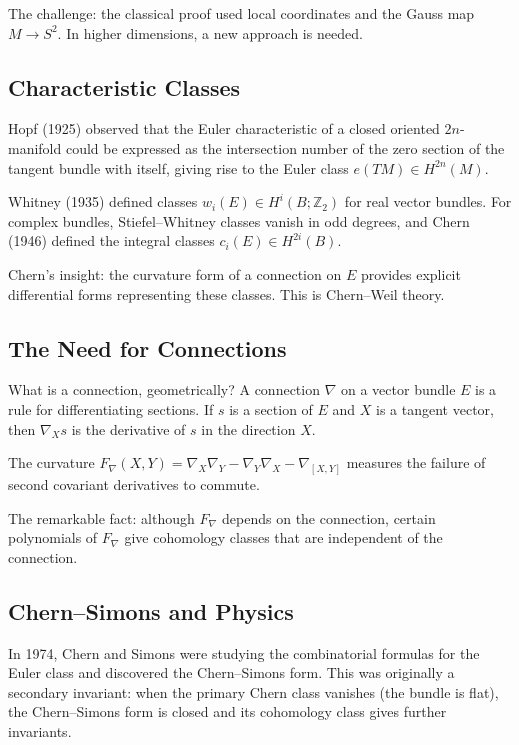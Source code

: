The challenge: the classical proof used local coordinates and the Gauss map $M \to S^2$. In higher dimensions, a new approach is needed.

\subsection{Characteristic Classes}

Hopf (1925) observed that the Euler characteristic of a closed oriented $2n$-manifold could be expressed as the intersection number of the zero section of the tangent bundle with itself, giving rise to the Euler class $e(TM) \in H^{2n}(M)$.

Whitney (1935) defined classes $w_i(E) \in H^i(B; \mathbb{Z}_2)$ for real vector bundles. For complex bundles, Stiefel--Whitney classes vanish in odd degrees, and Chern (1946) defined the integral classes $c_i(E) \in H^{2i}(B)$.

Chern's insight: the curvature form of a connection on $E$ provides explicit differential forms representing these classes. This is Chern--Weil theory.

\subsection{The Need for Connections}

What is a connection, geometrically? A connection $\nabla$ on a vector bundle $E$ is a rule for differentiating sections. If $s$ is a section of $E$ and $X$ is a tangent vector, then $\nabla_X s$ is the derivative of $s$ in the direction $X$.

The curvature $F_\nabla(X,Y) = \nabla_X \nabla_Y - \nabla_Y \nabla_X - \nabla_{[X,Y]}$ measures the failure of second covariant derivatives to commute.

The remarkable fact: although $F_\nabla$ depends on the connection, certain polynomials of $F_\nabla$ give cohomology classes that are independent of the connection.

\subsection{Chern--Simons and Physics}

In 1974, Chern and Simons were studying the combinatorial formulas for the Euler class and discovered the Chern--Simons form. This was originally a secondary invariant: when the primary Chern class vanishes (the bundle is flat), the Chern--Simons form is closed and its cohomology class gives further invariants.

